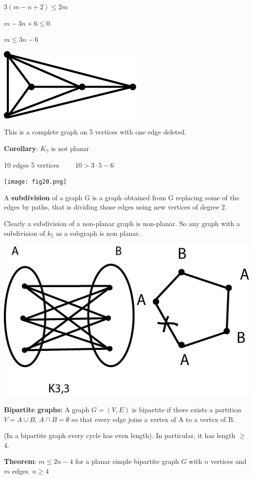 \documentclass[9pt, letterpaper, oneside]{article}
\begin{document}
$3(m-n+2) \leq 2m$

$m -3n + 6 \leq 0$

$m \leq 3n - 6$

\includegraphics{fig19.png}

This is a complete graph on 5 vertices with one edge deleted. 

\textbf{Corollary}: $K_5$ is not planar

10 edges 5 vertices $\qquad 10 > 3 \cdot 5 - 6$

\texttt{[image: fig20.png]}

A \textbf{subdivision} of a graph G is a graph obtained from G replacing some of the edges by paths, that is dividing those edges using new vertices of degree 2.

Clearly a subdivision of a non-planar graph is non-planar. So any graph with a subdivision of $k_5$ as a subgraph is non planar.

\includegraphics{fig21.png}

\textbf{Bipartite graphs:} A graph $G = (V,E)$ is bipartite if there exists a partition $V = A \cup B$, $A \cap B = \emptyset$ so that every edge joins a vertex of A to a vertex of B.

(In a bipartite graph every cycle has even length). In particular, it has length $\geq$ 4.

\textbf{Theorem}: $m \leq 2n - 4$ for a planar simple bipartite graph $G$ with $n$ vertices and $m$ edges. $n \geq 4$
\end{document}
